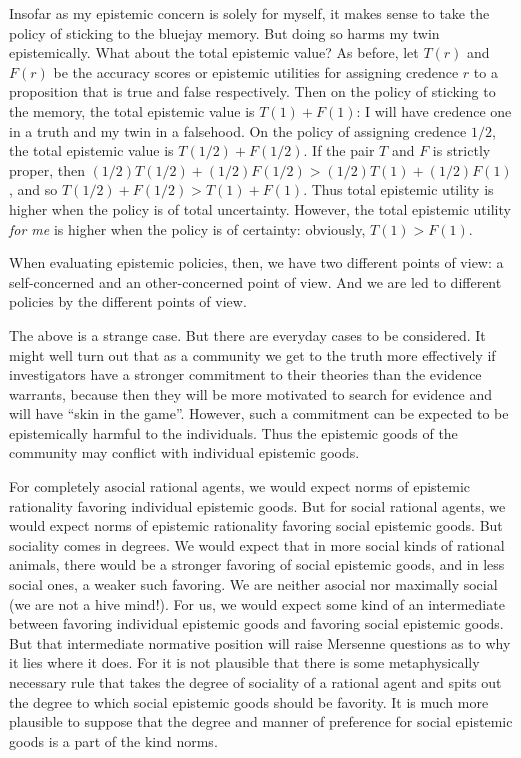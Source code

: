 Insofar as my epistemic concern is solely for myself, it makes sense to take the policy of sticking to the bluejay memory.
But doing so harms my twin epistemically. What about the total epistemic value? As before, let $T(r)$ and $F(r)$ be the accuracy 
scores or epistemic utilities for assigning credence $r$ to a proposition that is true and false respectively. Then on the policy 
of sticking to the memory, the total epistemic value is $T(1)+F(1)$: I will have credence one in a truth and my twin in a falsehood.
On the policy of assigning credence $1/2$, the total epistemic value is $T(1/2)+F(1/2)$. If the pair $T$ and $F$ is strictly proper,
then $(1/2)T(1/2)+(1/2)F(1/2) > (1/2)T(1)+(1/2)F(1)$, and so $T(1/2)+F(1/2)>T(1)+F(1)$. Thus total epistemic utility is higher
when the policy is of total uncertainty. However, the total epistemic utility \textit{for me} is higher when the policy is of
certainty: obviously, $T(1)>F(1)$. 

When evaluating epistemic policies, then, we have two different points of view: a self-concerned and an other-concerned 
point of view. And we are led to different policies by the different points of view.

The above is a strange case. But there are everyday cases to be considered. It might well turn out that as a community we 
get to the truth more effectively if investigators have a stronger commitment to their theories than the evidence warrants,
because then they will be more motivated to search for evidence and will have ``skin in the game''. However, such a commitment
can be expected to be epistemically harmful to the individuals. Thus the epistemic goods of the community may conflict with 
individual epistemic goods. 

For completely asocial rational agents, we would expect norms of epistemic rationality favoring individual epistemic goods. But for 
social rational agents, we would expect norms of epistemic rationality favoring social epistemic goods. But sociality comes in degrees.
We would expect that in more social kinds of rational animals, there would be a stronger favoring of social epistemic goods, and in
less social ones, a weaker such favoring. We are neither asocial nor maximally social (we are not a hive mind!). For us, we would expect
some kind of an intermediate between favoring individual epistemic goods and favoring social epistemic goods. But that intermediate 
normative position will raise Mersenne questions as to why it lies where it does. For it is not plausible that there is some 
metaphysically necessary rule that takes the degree of sociality of a rational agent and spits out the degree to which social epistemic 
goods should be favority. It is much more plausible to suppose that the degree and manner of preference for social epistemic goods is 
a part of the kind norms. 

